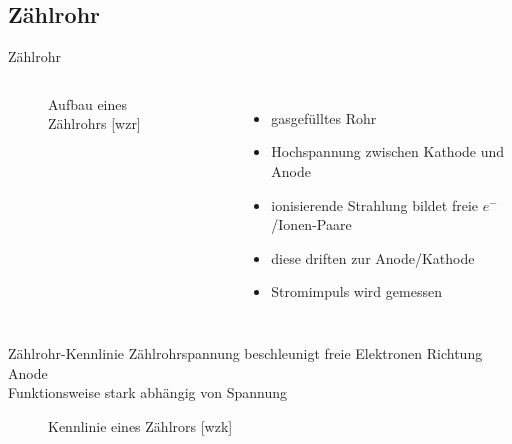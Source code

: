 \subsection[]{Zählrohr}

\begin{frame}{Zählrohr}
    \begin{columns}[T]
    
			\begin{figure}[htbp]
			  \centering
			  
			  \caption{Aufbau eines Zählrohrs [wzr]}
			\end{figure}
			
	    	\begin{itemize}
	    	  \item gasgefülltes Rohr
			  \item Hochspannung zwischen Kathode und Anode
			  \item ionisierende Strahlung bildet freie $e^-$/Ionen-Paare
			  \item diese driften zur Anode/Kathode
			  \item Stromimpuls wird gemessen
			\end{itemize}
    \end{columns}
\end{frame}


\begin{frame}{Zählrohr-Kennlinie}
	Zählrohrspannung beschleunigt freie Elektronen Richtung Anode \\
	Funktionsweise stark abhängig von Spannung
	
	\begin{figure}[htbp]
	  \centering
	  
	  \caption{Kennlinie eines Zählrors [wzk]}
	\end{figure}
\end{frame}	


